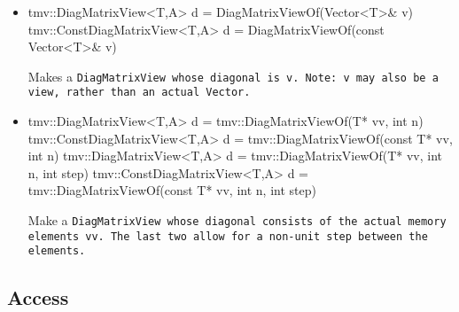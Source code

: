 \begin{itemize}
\item
\begin{tmvcode}
tmv::DiagMatrixView<T,A> d = DiagMatrixViewOf(Vector<T>& v)
tmv::ConstDiagMatrixView<T,A> d = DiagMatrixViewOf(const Vector<T>& v)
\end{tmvcode}
Makes a \tt{DiagMatrixView} whose diagonal is \tt{v}.  Note: \tt{v} may also be a view, rather than an actual \tt{Vector}.

\item
\begin{tmvcode}
tmv::DiagMatrixView<T,A> d = tmv::DiagMatrixViewOf(T* vv, int n)
tmv::ConstDiagMatrixView<T,A> d = 
      tmv::DiagMatrixViewOf(const T* vv, int n)
tmv::DiagMatrixView<T,A> d = 
      tmv::DiagMatrixViewOf(T* vv, int n, int step)
tmv::ConstDiagMatrixView<T,A> d = 
      tmv::DiagMatrixViewOf(const T* vv, int n, int step)
\end{tmvcode}
Make a \tt{DiagMatrixView} whose diagonal consists of the actual memory elements \tt{vv}.  The last two allow for a non-unit step between the elements.

\end{itemize}


\subsection{Access}
\label{DiagMatrix_Access}

